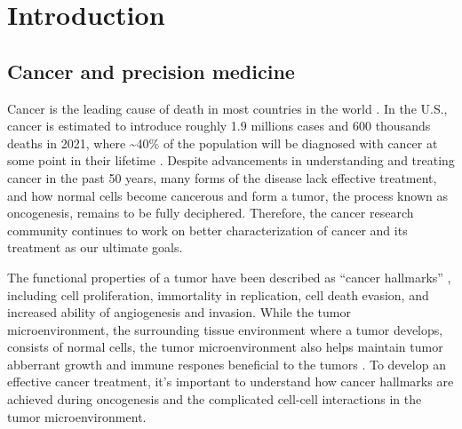\chapter{Introduction}
\label{chap:intro}
\tightlists



\section{Cancer and precision medicine}
Cancer is the leading cause of death in most countries in the world \cite{sungh_brayf:GlobalCancer2021}. In the U.S., cancer is estimated to introduce roughly 1.9 millions cases and 600 thousands deaths in 2021, where \textasciitilde40\% of the population will be diagnosed with cancer at some point in their lifetime \cite{siegelrl_jemala:CancerStatistics2021}. Despite advancements in understanding and treating cancer in the past 50 years, many forms of the disease lack effective treatment, and how normal cells become cancerous and form a tumor, the process known as oncogenesis, remains to be fully deciphered. Therefore, the cancer research community continues to work on better characterization of cancer and its treatment as our ultimate goals.

The functional properties of a tumor have been described as ``cancer hallmarks'' \cite{hanahand_weinbergra:HallmarksCancer2011}, including cell proliferation, immortality in replication, cell death evasion, and increased ability of angiogenesis and invasion. While the tumor microenvironment, the surrounding tissue environment where a tumor develops, consists of normal cells, the tumor microenvironment also helps maintain tumor abberrant growth and immune respones beneficial to the tumors \cite{hanahand_weinbergra:HallmarksCancer2011,quaildf_joyceja:MicroenvironmentalRegulation2013}. To develop an effective cancer treatment, it's important to understand how cancer hallmarks are achieved during oncogenesis and the complicated cell-cell interactions in the tumor microenvironment.


